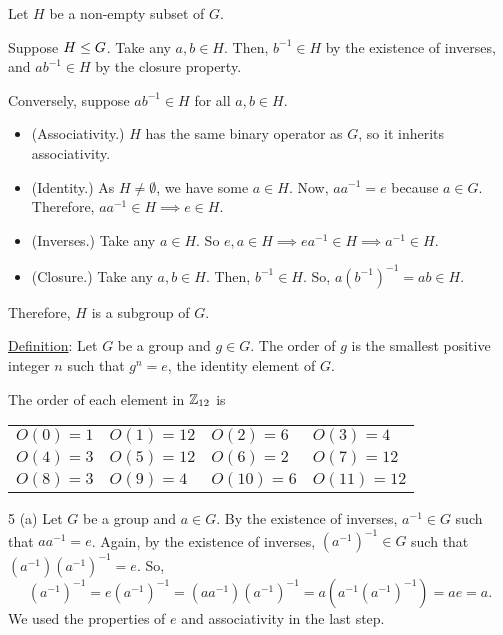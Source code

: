 \documentclass[11pt]{penrose}
\begin{document}
\begin{problem}{3}
    Let $H$ be a non-empty subset of $G$.

    Suppose $H \mathrel{\leq} G$. Take any $a, b \in H$. Then, $b^{-1} \in H$ by the existence of inverses, and $a b^{-1} \in H$ by the closure property.

    Conversely, suppose $a b^{-1} \in H$ for all $a, b \in H$.
    \begin{itemize}
        \item (Associativity.) $H$ has the same binary operator as $G$, so it inherits associativity.
        \item (Identity.) As $H \neq \emptyset$, we have some $a \in H$. Now, $a a^{-1} = e$ because $a \in G$. Therefore, $a a^{-1} \in H \implies e \in H$.
        \item (Inverses.) Take any $a \in H$. So $e, a \in H \implies e a^{-1} \in H \implies a^{-1} \in H$.
        \item (Closure.) Take any $a, b \in H$. Then, $b^{-1} \in H$. So, $a (b^{-1})^{-1} = ab \in H$.
    \end{itemize}
    Therefore, $H$ is a subgroup of $G$.
\end{problem}

\begin{problem}{4}
    \underline{Definition}: Let $G$ be a group and $g \in G$. The order of $g$ is the smallest positive integer $n$ such that $g^n = e$, the identity element of $G$.

    The order of each element in $\mathbb{Z}_{12}$ is
    \begin{center}
    \begin{tabularx}{0.8\textwidth}{XXXX}
        $O(0)  =  1$ & $O(1)  = 12$ & $O(2)  =  6$ & $O(3)  =  4$\\
        $O(4)  =  3$ & $O(5)  = 12$ & $O(6)  =  2$ & $O(7)  = 12$\\
        $O(8)  =  3$ & $O(9)  =  4$ & $O(10) =  6$ & $O(11) = 12$\\
    \end{tabularx}
    \end{center}
\end{problem}

\begin{problem}{5 (a)}
    Let $G$ be a group and $a \in G$. By the existence of inverses, $a^{-1} \in G$ such that $a a^{-1} = e$. Again, by the existence of inverses, $(a^{-1})^{-1} \in G$ such that $(a^{-1}) (a^{-1})^{-1} = e$. So,
    \begin{equation*}
        (a^{-1})^{-1}
        = e (a^{-1})^{-1}
        = (a a^{-1}) (a^{-1})^{-1}
        = a (a^{-1} (a^{-1})^{-1})
        = a e = a.
    \end{equation*}
    We used the properties of $e$ and associativity in the last step.
\end{problem}
\end{document}

